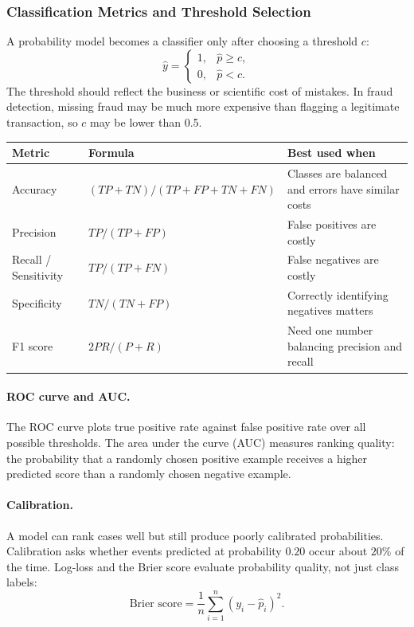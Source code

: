 \documentclass[12pt,openany]{book}
\begin{document}
\subsubsection{Classification Metrics and Threshold Selection}

A probability model becomes a classifier only after choosing a threshold \(c\):
\[
\hat{y}=\begin{cases}
1, & \hat{p}\geq c,\\
0, & \hat{p}<c.
\end{cases}
\]
The threshold should reflect the business or scientific cost of mistakes. In fraud detection, missing fraud may be much more expensive than flagging a legitimate transaction, so \(c\) may be lower than 0.5.

\begin{center}
\small
\renewcommand{\arraystretch}{1.15}
\begin{tabular}{|L{0.22\textwidth}|L{0.30\textwidth}|L{0.36\textwidth}|}
\hline
    Metric & Formula & Best used when \\
\hline
    Accuracy & \((TP+TN)/(TP+FP+TN+FN)\) & Classes are balanced and errors have similar costs \\
\hline
    Precision & \(TP/(TP+FP)\) & False positives are costly \\
\hline
    Recall / Sensitivity & \(TP/(TP+FN)\) & False negatives are costly \\
\hline
    Specificity & \(TN/(TN+FP)\) & Correctly identifying negatives matters \\
\hline
    F1 score & \(2PR/(P+R)\) & Need one number balancing precision and recall \\
\hline
\end{tabular}
\end{center}
\normalsize

\paragraph{ROC curve and AUC.}
The ROC curve plots true positive rate against false positive rate over all possible thresholds. The area under the curve (AUC) measures ranking quality: the probability that a randomly chosen positive example receives a higher predicted score than a randomly chosen negative example.

\paragraph{Calibration.}
A model can rank cases well but still produce poorly calibrated probabilities. Calibration asks whether events predicted at probability \(0.20\) occur about \(20\%\) of the time. Log-loss and the Brier score evaluate probability quality, not just class labels:
\[
\text{Brier score}=\frac{1}{n}\sum_{i=1}^{n}(y_i-\hat{p}_i)^2.
\]
\end{document}
